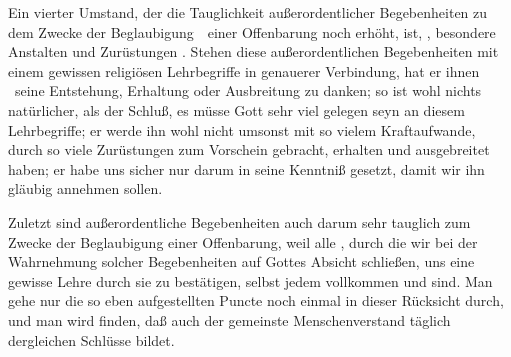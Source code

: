 \begin{aufza}
\item Ein vierter Umstand, der die Tauglichkeit außerordentlicher Begebenheiten zu dem Zwecke der Beglaubigung~\ einer Offenbarung noch erhöht, ist, , besondere Anstalten und Zurüstungen . Stehen diese außerordentlichen Begebenheiten mit einem gewissen religiösen Lehrbegriffe in genauerer Verbindung, hat er ihnen \zB\ seine Entstehung, Erhaltung oder Ausbreitung zu danken; so ist wohl nichts natürlicher, als der Schluß, es müsse Gott sehr viel gelegen seyn an diesem Lehrbegriffe; er werde ihn wohl nicht umsonst mit so vielem Kraftaufwande, durch so viele Zurüstungen zum Vorschein gebracht, erhalten und ausgebreitet haben; er habe uns sicher nur darum in seine Kenntniß gesetzt, damit wir ihn gläubig annehmen sollen.
\item Zuletzt sind außerordentliche Begebenheiten auch darum sehr tauglich zum Zwecke der Beglaubigung einer Offenbarung, weil alle , durch die wir bei der Wahrnehmung solcher Begebenheiten auf Gottes Absicht schließen, uns eine gewisse Lehre durch sie zu bestätigen, selbst jedem  vollkommen  und  sind. Man gehe nur die so eben aufgestellten Puncte noch einmal in dieser Rücksicht durch, und man wird finden, daß auch der gemeinste Menschenverstand täglich dergleichen Schlüsse bildet.
\end{aufza}


